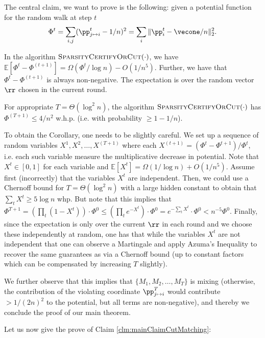 The central claim, we want to prove is the following: given a potential function for the random walk at step $t$
\[
    \Phi^t = \sum_{i,j} (\pp_{j \mapsto i}^t - 1/n)^2 = \sum_{i} \|\pp_{i}^t - \vecone/n\|_2^2.
\]
\begin{claim}\label{clm:mainClaimCutMatching}
In the algorithm $\textsc{SparsityCertifyOrCut}(\cdot)$, we have $\mathbb{E}[\Phi^{t} - \Phi^{(t+1)}] = \Omega(\Phi^t / \log n) - O(1/n^5)$. Further, we have that $\Phi^{t} - \Phi^{(t+1)}$ is always non-negative. The expectation is over the random vector $\rr$ chosen in the current round.
\end{claim}

\begin{corollary}\label{cor:fewRoundsCutMathcing}
For appropriate $T = \Theta(\log^2 n)$, the algorithm $\textsc{SparsityCertifyOrCut}(\cdot)$ has $\Phi^{(T+1)} \leq 4/n^2$ w.h.p. (i.e. with probability $\geq 1-1/n$).
\end{corollary}

To obtain the Corollary, one needs to be slightly careful. We set up a sequence of random variables $X^1, X^2, \ldots, X^{(T+1)}$ where each $X^{(t+1)} = (\Phi^{t} - \Phi^{t+1})/\Phi^t$, i.e. each such variable measure the multiplicative decrease in potential. Note that $X^t \in [0,1]$ for each variable and $\mathbb{E}[X^t] = \Omega(1/\log n) + O(1/n^5)$. Assume first (incorrectly) that the variables $X^t$ are independent. Then, we could use a Chernoff bound for $T = \Theta(\log^2 n)$ with a large hidden constant to obtain that $\sum_{t} X^t \geq 5 \log n$ whp. But note that this implies that $\Phi^{T+1} = \left(\prod_t (1 - X^t)\right) \cdot \Phi^{0} \leq \left(\prod_t e^{-X^t}\right) \cdot \Phi^{0}= e^{- \sum_t X^t} \cdot \Phi^{0} < n^{-5} \Phi^0$. Finally, since the expectation is only over the current $\rr$ in each round and we choose these independently at random, one has that while the variables $X^t$ are not independent that one can observe a Martingale and apply Azuma's Inequality to recover the same guarantees as via a Chernoff bound (up to constant factors which can be compensated by increasing $T$ slightly).

We further observe that this implies that $\{M_1, M_2, \dots, M_{T}\}$ is mixing (otherwise, the contribution of the violating coordinate $\pp^T_{j \mapsto i}$ would contribute $>1/(2n)^2$ to the potential, but all terms are non-negative), and thereby we conclude the proof of our main theorem. 

Let us now give the prove of Claim \ref{clm:mainClaimCutMatching}: 

